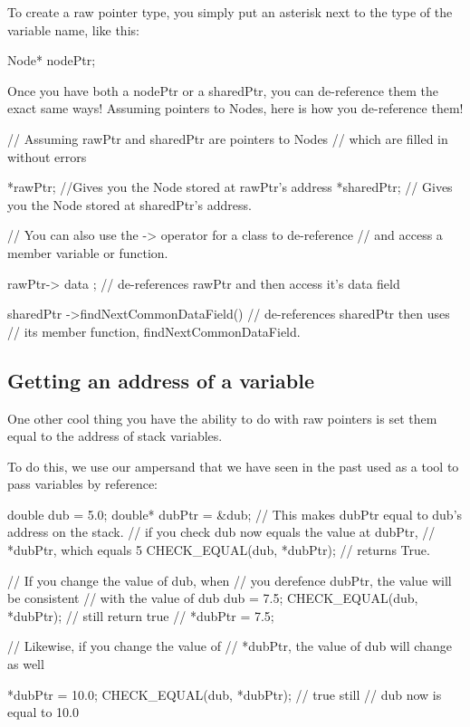 \documentclass{tufte-handout}
\begin{document}
To create a raw pointer type, you simply put an asterisk next to the type of the variable name, like this:
\begin{Code}
    Node* nodePtr;
\end{Code}

Once you have both a nodePtr or a sharedPtr, you can de-reference them the exact same ways!
Assuming pointers to Nodes, here is how you de-reference them!
\begin{Code}
    // Assuming rawPtr and sharedPtr are pointers to Nodes
    // which are filled in without errors
    
    *rawPtr; //Gives you the Node stored at rawPtr's address
    *sharedPtr; // Gives you the Node stored at sharedPtr's address.
    
    
    // You can also use the -> operator for a class to de-reference 
    // and access a member variable or function.
    
    rawPtr-> data ; 
    // de-references rawPtr and then access it's data field
    
    sharedPtr ->findNextCommonDataField() 
    // de-references sharedPtr then uses 
    // its member function, findNextCommonDataField.
     
\end{Code}

\subsection{Getting an address of a variable}
One other cool thing you have the ability to do with raw pointers is set them equal to the address of stack variables.

To do this, we use our ampersand that we have seen in the past used as a tool to pass variables by reference:
\begin{Code}
    double dub = 5.0; 
    double* dubPtr = &dub; 
    // This makes dubPtr equal to dub's address on the stack.
    // if you check dub now equals the value at dubPtr,
    // *dubPtr, which equals 5 
    CHECK_EQUAL(dub, *dubPtr); // returns True.
    
    // If you change the value of dub, when
    // you derefence dubPtr, the value will be consistent
    // with the value of dub
    dub = 7.5;
    CHECK_EQUAL(dub, *dubPtr); // still return true
    // *dubPtr = 7.5;
    
    // Likewise, if you change the value of 
    // *dubPtr, the value of dub will change as well
    
    *dubPtr = 10.0;
    CHECK_EQUAL(dub, *dubPtr); // true still
    // dub now is equal to 10.0
    
    
\end{Code}
\end{document}
